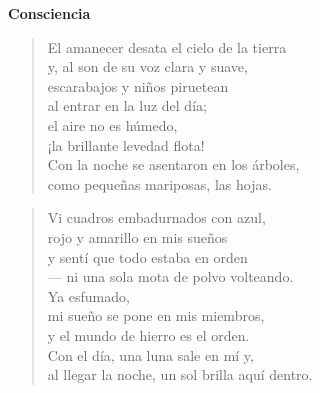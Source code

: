 \vspace*{-15mm}
\centeredornament
\vspace*{2mm}


\begin{center}
  \textbf{\large Consciencia}
\end{center}





\begin{verse}
  El amanecer desata el cielo de la tierra \\
  y, al son de su voz clara y suave, \\
  escarabajos y niños piruetean \\
  al entrar en la luz del día; \\
  el aire no es húmedo, \\
  ¡la brillante levedad flota! \\
  Con la noche se asentaron en los árboles, \\
  como pequeñas mariposas, las hojas. \\
\end{verse}

\bigskip



\begin{verse}
  Vi cuadros embadurnados con azul, \\
  rojo y amarillo en mis sueños \\
  y sentí que todo estaba en orden \\
  --- ni una sola mota de polvo volteando. \\
  Ya esfumado, \\
  mi sueño se pone en mis miembros, \\
  y el mundo de hierro es el orden. \\
  Con el día, una luna sale en mí y, \\
  al llegar la noche, un sol brilla aquí dentro. \\
\end{verse}

